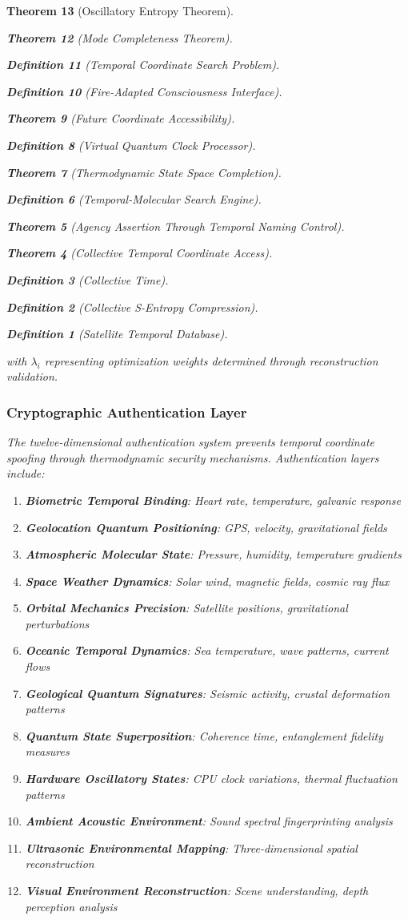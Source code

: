 \documentclass[12pt,a4paper]{article}
\newtheorem{theorem}{Theorem}[section]
\newtheorem{definition}[theorem]{Definition}
\begin{document}
\begin{theorem}[Oscillatory Entropy Theorem]
\begin{theorem}[Mode Completeness Theorem]
\begin{enumerate}
\begin{definition}[Temporal Coordinate Search Problem]
\begin{algorithm}
\begin{definition}[Fire-Adapted Consciousness Interface]
\begin{theorem}[Future Coordinate Accessibility]
\begin{definition}[Virtual Quantum Clock Processor]
\begin{itemize}
\begin{itemize}
\begin{theorem}[Thermodynamic State Space Completion]
\begin{definition}[Temporal-Molecular Search Engine]
\begin{theorem}[Agency Assertion Through Temporal Naming Control]
\begin{remark}
\begin{theorem}[Collective Temporal Coordinate Access]
\begin{definition}[Collective Time]
\begin{definition}[Collective S-Entropy Compression]
\begin{definition}[Satellite Temporal Database]
\begin{algorithm}
\begin{table}[h]
{with $\lambda_i$ representing optimization weights determined through reconstruction validation.

\subsubsection{Cryptographic Authentication Layer}

The twelve-dimensional authentication system prevents temporal coordinate spoofing through thermodynamic security mechanisms. Authentication layers include:

\begin{enumerate}
\item \textbf{Biometric Temporal Binding}: Heart rate, temperature, galvanic response
\item \textbf{Geolocation Quantum Positioning}: GPS, velocity, gravitational fields
\item \textbf{Atmospheric Molecular State}: Pressure, humidity, temperature gradients
\item \textbf{Space Weather Dynamics}: Solar wind, magnetic fields, cosmic ray flux
\item \textbf{Orbital Mechanics Precision}: Satellite positions, gravitational perturbations
\item \textbf{Oceanic Temporal Dynamics}: Sea temperature, wave patterns, current flows
\item \textbf{Geological Quantum Signatures}: Seismic activity, crustal deformation patterns
\item \textbf{Quantum State Superposition}: Coherence time, entanglement fidelity measures
\item \textbf{Hardware Oscillatory States}: CPU clock variations, thermal fluctuation patterns
\item \textbf{Ambient Acoustic Environment}: Sound spectral fingerprinting analysis
\item \textbf{Ultrasonic Environmental Mapping}: Three-dimensional spatial reconstruction
\item \textbf{Visual Environment Reconstruction}: Scene understanding, depth perception analysis

\end{enumerate}}
\end{table}
\end{algorithm}
\end{definition}
\end{definition}
\end{definition}
\end{theorem}
\end{remark}
\end{theorem}
\end{definition}
\end{theorem}
\end{itemize}
\end{itemize}
\end{definition}
\end{theorem}
\end{definition}
\end{algorithm}
\end{definition}
\end{enumerate}
\end{theorem}
\end{theorem}
\end{document}
